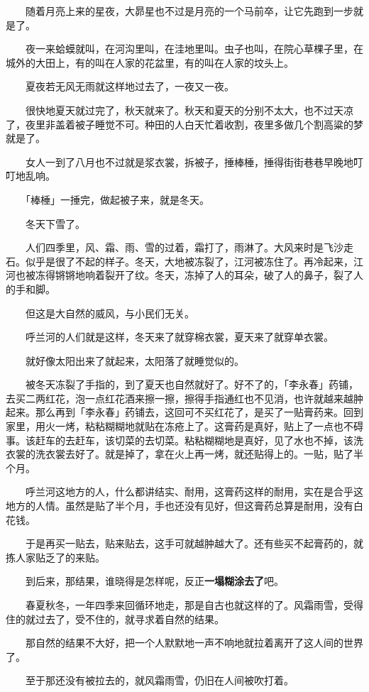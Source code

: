 \documentclass[UTF8]{ctexart}
\begin{document}
　　随着月亮上来的星夜，大昴星也不过是月亮的一个马前卒，让它先跑到一步就是了。

　　夜一来蛤蟆就叫，在河沟里叫，在洼地里叫。虫子也叫，在院心草棵子里，在城外的大田上，有的叫在人家的花盆里，有的叫在人家的坟头上。

　　夏夜若无风无雨就这样地过去了，一夜又一夜。

　　很快地夏天就过完了，秋天就来了。秋天和夏天的分别不太大，也不过天凉了，夜里非盖着被子睡觉不可。种田的人白天忙着收割，夜里多做几个割高粱的梦就是了。

　　女人一到了八月也不过就是浆衣裳，拆被子，捶棒棰，捶得街街巷巷早晚地叮叮地乱响。

　　「棒棰」一捶完，做起被子来，就是冬天。

　　冬天下雪了。

　　人们四季里，风、霜、雨、雪的过着，霜打了，雨淋了。大风来时是飞沙走石。似乎是很了不起的样子。冬天，大地被冻裂了，江河被冻住了。再冷起来，江河也被冻得锵锵地响着裂开了纹。冬天，冻掉了人的耳朵，破了人的鼻子，裂了人的手和脚。

　　但这是大自然的威风，与小民们无关。

　　呼兰河的人们就是这样，冬天来了就穿棉衣裳，夏天来了就穿单衣裳。

　　就好像太阳出来了就起来，太阳落了就睡觉似的。

　　被冬天冻裂了手指的，到了夏天也自然就好了。好不了的，「李永春」药铺，去买二两红花，泡一点红花酒来擦一擦，擦得手指通红也不见消，也许就越来越肿起来。那么再到「李永春」药铺去，这回可不买红花了，是买了一贴膏药来。回到家里，用火一烤，粘粘糊糊地就贴在冻疮上了。这膏药是真好，贴上了一点也不碍事。该赶车的去赶车，该切菜的去切菜。粘粘糊糊地是真好，见了水也不掉，该洗衣裳的洗衣裳去好了。就是掉了，拿在火上再一烤，就还贴得上的。一贴，贴了半个月。

　　呼兰河这地方的人，什么都讲结实、耐用，这膏药这样的耐用，实在是合乎这地方的人情。虽然是贴了半个月，手也还没有见好，但这膏药总算是耐用，没有白花钱。

　　于是再买一贴去，贴来贴去，这手可就越肿越大了。还有些买不起膏药的，就拣人家贴乏了的来贴。

　　到后来，那结果，谁晓得是怎样呢，反正\textbf{一塌糊涂去了}吧。

　　春夏秋冬，一年四季来回循环地走，那是自古也就这样的了。风霜雨雪，受得住的就过去了，受不住的，就寻求着自然的结果。

　　那自然的结果不大好，把一个人默默地一声不响地就拉着离开了这人间的世界了。

　　至于那还没有被拉去的，就风霜雨雪，仍旧在人间被吹打着。
\end{document}
